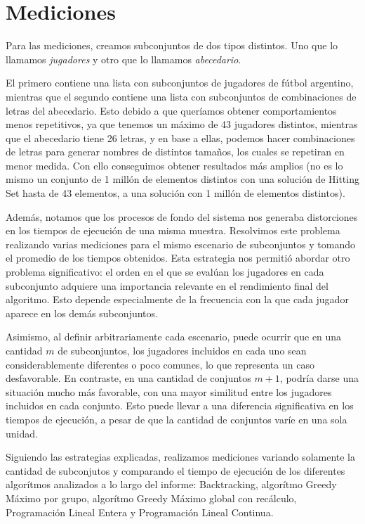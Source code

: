 \section{Mediciones}

Para las mediciones, creamos subconjuntos de dos tipos distintos. Uno que lo llamamos \textit{jugadores} y otro que lo llamamos \textit{abecedario}.

El primero contiene una lista con subconjuntos de jugadores de fútbol argentino, mientras que el segundo contiene una lista con subconjuntos de combinaciones de letras del abecedario. Esto debido a que queríamos obtener comportamientos menos repetitivos, ya que tenemos un máximo de 43 jugadores distintos, mientras que el abecedario tiene 26 letras, y en base a ellas, podemos hacer combinaciones de letras para generar nombres de distintos tamaños, los cuales se repetiran en menor medida.
Con ello conseguimos obtener resultados más amplios (no es lo mismo un conjunto de 1 millón de elementos distintos con una solución de Hitting Set hasta de 43 elementos, a una solución con 1 millón de elementos distintos).

Además, notamos que los procesos de fondo del sistema nos generaba distorciones en los tiempos de ejecución de una misma muestra. Resolvimos este problema realizando varias mediciones para el mismo escenario de subconjuntos y tomando el promedio de los tiempos obtenidos. Esta estrategia nos permitió abordar otro problema significativo: el orden en el que se evalúan los jugadores en cada subconjunto adquiere una importancia relevante en el rendimiento final del algoritmo. Esto depende especialmente de la frecuencia con la que cada jugador aparece en los demás subconjuntos. 

Asimismo, al definir arbitrariamente cada escenario, puede ocurrir que en una cantidad 
$m$ de subconjuntos, los jugadores incluidos en cada uno sean considerablemente diferentes o poco comunes, lo que representa un caso desfavorable. En contraste, en una cantidad de conjuntos $m+1$, podría darse una situación mucho más favorable, con una mayor similitud entre los jugadores incluidos en cada conjunto. Esto puede llevar a una diferencia significativa en los tiempos de ejecución, a pesar de que la cantidad de conjuntos varíe en una sola unidad.

Siguiendo las estrategias explicadas, realizamos mediciones variando solamente la cantidad de subconjutos y comparando el tiempo de ejecución de los diferentes algorítmos analizados a lo largo del informe: Backtracking, algorítmo Greedy Máximo por grupo, algorítmo Greedy Máximo global con recálculo, Programación Lineal Entera y Programación Lineal Continua.

